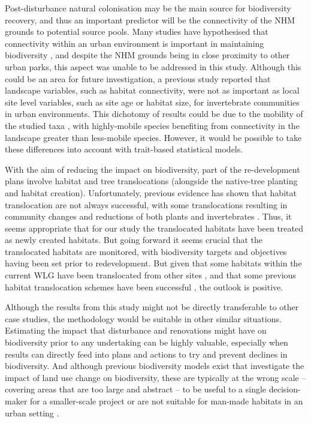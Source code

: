 Post-disturbance natural colonisation may be the main source for biodiversity recovery, and thus an important predictor will be the connectivity of the NHM grounds to potential source pools.  Many studies have hypothesised that connectivity within an urban environment is important in maintaining biodiversity \citep{Ockinger:2009lup,Goddard:2010tree,Kong:2010lup,Vergnes:2012bc}, and despite the NHM grounds being in close proximity to other urban parks, this aspect was unable to be addressed in this study. Although this could be an area for future investigation, a previous study \citep{Angold:2006ste} reported that landscape variables, such as habitat connectivity, were not as important as local site level variables, such as site age or habitat size, for invertebrate communities in urban environments. This dichotomy of results could be due to the mobility of the studied taxa \citep{Braaker:2014ec}, with highly-mobile species benefiting from connectivity in the landscape greater than less-mobile species.  However, it would be possible to take these differences into account with trait-based statistical models.

With the aim of reducing the impact on biodiversity, part of the re-development plans involve habitat and tree translocations (alongside the native-tree planting and habitat creation).  Unfortunately, previous evidence has shown that habitat translocation are not always successful, with some translocations resulting in community changes and reductions of both plants and invertebrates \citep{Bullock:1998bc,jncc:2003ht}. Thus, it seems appropriate that for our study the translocated habitats have been treated as newly created habitats.  But going forward it seems crucial that the translocated habitats are monitored, with biodiversity targets and objectives having been set prior to redevelopment. But given that some habitats within the current WLG have been translocated from other sites \citep{Honey:1999ln,Leigh:2003ln}, and that some previous habitat translocation schemes have been successful \citep{dunford:2010,Twyford:2012}, the outlook is positive.

Although the results from this study might not be directly transferable to other case studies, the methodology would be suitable in other similar situations. Estimating the impact that disturbance and renovations might have on biodiversity prior to any undertaking can be highly valuable, especially when results can directly feed into plans and actions to try and prevent declines in biodiversity. And although previous biodiversity models exist that investigate the impact of land use change on biodiversity, these are typically at the wrong scale -- covering areas that are too large and abstract -- to be useful to a single decision-maker for a smaller-scale project \citep[e.g.][]{Newbold:2015nat} or are not suitable for man-made habitats in an urban setting \citep[e.g.][]{defra:2012bdo}.

